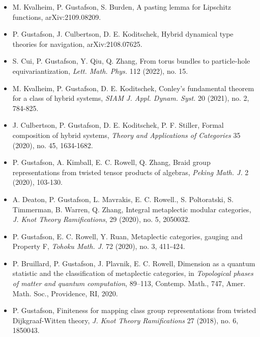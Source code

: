   \begin{itemize}

    \item[] M. Kvalheim, P. Gustafson, S. Burden, {A pasting lemma for Lipschitz functions}, arXiv:2109.08209.

  
  \item[] P. Gustafson, J. Culbertson, D. E. Koditschek, {Hybrid dynamical type theories for navigation}, arXiv:2108.07625.
  
\item[] S. Cui, P. Gustafson, Y. Qiu, Q. Zhang, {From torus bundles to particle-hole equivariantization}, \emph{Lett. Math. Phys.} {112} (2022), no. 15.
  
\item[] M. Kvalheim, P. Gustafson, D. E. Koditschek, {Conley's fundamental theorem for a class of hybrid systems}, \emph{SIAM J. Appl. Dynam. Syst.} {20} (2021), no. 2, 784-825.

\item[] J. Culbertson, P. Gustafson, D. E. Koditschek, P. F. Stiller, {Formal composition of hybrid systems}, \emph{Theory and Applications of Categories} {35} (2020), no. 45, 1634-1682.

  \item[] P. Gustafson, A. Kimball, E. C. Rowell, Q. Zhang, {Braid group representations from twisted tensor products of algebras}, \emph{Peking Math. J.} 2 (2020), 103-130.

  \item[]  A. Deaton, P. Gustafson, L. Mavrakis, E. C. Rowell., S. Poltoratski, S. Timmerman, B. Warren, Q. Zhang, {Integral metaplectic modular categories}, \emph{J. Knot Theory Ramifications}, 29 (2020), no. 5, 2050032.
  
  \item[] P. Gustafson, E. C. Rowell, Y. Ruan, {Metaplectic categories, gauging and Property F}, \emph{Tohoku Math. J.} {72} (2020), no. 3, 411-424.

  \item[] P. Bruillard, P. Gustafson, J. Plavnik, E. C. Rowell, {Dimension as a quantum statistic and the classification of metaplectic categories}, in \emph{Topological phases of matter and quantum computation}, 89–113, Contemp. Math., 747, Amer. Math. Soc., Providence, RI, 2020.
    
  \item[] P. Gustafson, {Finiteness for mapping class group representations from twisted Dijkgraaf-Witten theory}, \emph{J. Knot Theory Ramifications} 27 (2018), no. 6, 1850043.


\end{itemize}
